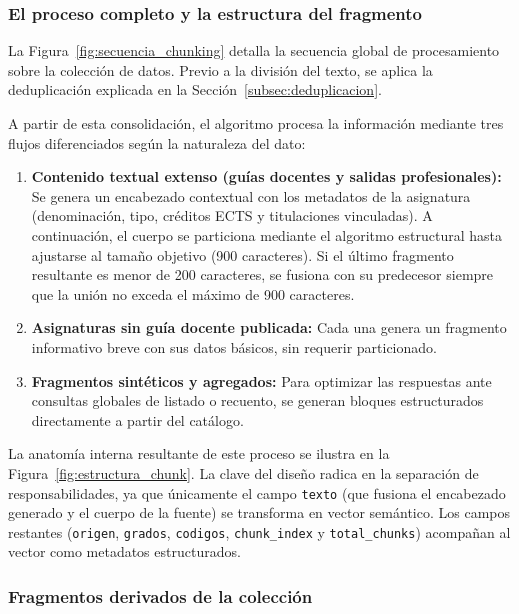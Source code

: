 \subsubsection[El proceso completo y la estructura del fragmento]{El proceso completo y la estructura del fragmento}
\label{secc:estructura_fragmento}

La Figura~\ref{fig:secuencia_chunking} detalla la secuencia global de procesamiento sobre la colección de datos. Previo a la división del texto, se aplica la deduplicación explicada en la Sección~\ref{subsec:deduplicacion}.

A partir de esta consolidación, el algoritmo procesa la información mediante tres flujos diferenciados según la naturaleza del dato:

\begin{enumerate}
  \item \textbf{Contenido textual extenso (guías docentes y salidas profesionales):} Se genera un encabezado contextual con los metadatos de la asignatura (denominación, tipo, créditos ECTS y titulaciones vinculadas). A continuación, el cuerpo se particiona mediante el algoritmo estructural hasta ajustarse al tamaño objetivo (900 caracteres). Si el último fragmento resultante es menor de 200 caracteres, se fusiona con su predecesor siempre que la unión no exceda el máximo de 900 caracteres.
  \item  \textbf{Asignaturas sin guía docente publicada:} Cada una genera un fragmento informativo breve con sus datos básicos, sin requerir particionado.
  \item \textbf{Fragmentos sintéticos y agregados:} Para optimizar las respuestas ante consultas globales de listado o recuento, se generan bloques estructurados directamente a partir del catálogo.
\end{enumerate}



La anatomía interna resultante de este proceso se ilustra en la Figura~\ref{fig:estructura_chunk}. La clave del diseño radica en la separación de responsabilidades, ya que únicamente el campo \texttt{texto} (que fusiona el encabezado generado y el cuerpo de la fuente) se transforma en vector semántico. Los campos restantes (\texttt{origen}, \texttt{grados}, \texttt{codigos}, \texttt{chunk\_index} y \texttt{total\_chunks}) acompañan al vector como metadatos estructurados.



\subsubsection[Fragmentos derivados de la colección]{Fragmentos derivados de la colección}
\label{secc:fragmentos_derivados}

